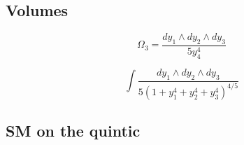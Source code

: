 \subsection{Volumes}
\begin{equation}
  \Omega_3=\frac{dy_1\wedge dy_2\wedge dy_3}{5y_4^4}
\end{equation}


\begin{equation}
  \int \frac{dy_1\wedge dy_2\wedge dy_3}{5(1+y_1^4+y_2^4+y_3^4)^{4/5}}
\end{equation}

\subsection{SM on the quintic}

%
%
%
